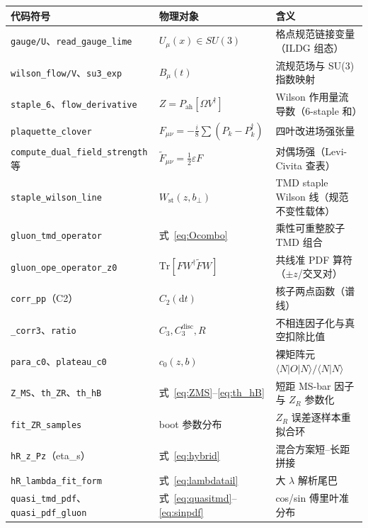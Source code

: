 \documentclass[UTF8]{ctexart}
\begin{document}
\begin{xltabular}{\textwidth}{Xll}
\toprule
代码符号 & 物理对象 & 含义 \\
\midrule
\endhead
\texttt{\nolinkurl{gauge/U}}、\texttt{\nolinkurl{read_gauge_lime}} & $U_\mu(x)\in SU(3)$ & 格点规范链接变量（ILDG 组态） \\
\texttt{\nolinkurl{wilson_flow/V}}、\texttt{\nolinkurl{su3_exp}} & $B_\mu(t)$ & 流规范场与 SU(3) 指数映射 \\
\texttt{\nolinkurl{staple_6}}、\texttt{\nolinkurl{flow_derivative}} & $Z=P_{\mathrm{ah}}[\Omega V^\dagger]$ & Wilson 作用量流导数（6-staple 和） \\
\texttt{\nolinkurl{plaquette_clover}} & $F_{\mu\nu}=-\frac{i}{8}\sum(P_k-P_k^\dagger)$ & 四叶改进场强张量 \\
\texttt{\nolinkurl{compute_dual_field_strength}} 等 & $\tilde F_{\mu\nu}=\frac12\varepsilon F$ & 对偶场强（Levi-Civita 查表） \\
\texttt{\nolinkurl{staple_wilson_line}} & $W_{\mathrm{st}}(z,b_\perp)$ & TMD staple Wilson 线（规范不变性载体） \\
\texttt{\nolinkurl{gluon_tmd_operator}} & 式~\eqref{eq:Ocombo} & 乘性可重整胶子 TMD 组合 \\
\texttt{\nolinkurl{gluon_ope_operator_z0}} & $\mathrm{Tr}[FW^\dagger\tilde FW]$ & 共线准 PDF 算符（$\pm z$/交叉对） \\
\texttt{\nolinkurl{corr_pp}}（C2） & $C_2(\mathrm dt)$ & 核子两点函数（谱线） \\
\texttt{\nolinkurl{_corr3}}、\texttt{\nolinkurl{ratio}} & $C_3,C_3^{\mathrm{disc}},R$ & 不相连因子化与真空扣除比值 \\
\texttt{\nolinkurl{para_c0}}、\texttt{\nolinkurl{plateau_c0}} & $c_0(z,b)$ & 裸矩阵元 $\langle N|O|N\rangle/\langle N|N\rangle$ \\
\texttt{\nolinkurl{Z_MS}}、\texttt{\nolinkurl{th_ZR}}、\texttt{\nolinkurl{th_hB}} & 式~\eqref{eq:ZMS}--\eqref{eq:th_hB} & 短距 MS-bar 因子与 $Z_R$ 参数化 \\
\texttt{\nolinkurl{fit_ZR_samples}} & boot 参数分布 & $Z_R$ 误差逐样本重拟合环 \\
\texttt{\nolinkurl{hR_z_Pz}}（eta\_s） & 式~\eqref{eq:hybrid} & 混合方案短--长距拼接 \\
\texttt{\nolinkurl{hR_lambda_fit_form}} & 式~\eqref{eq:lambdatail} & 大 $\lambda$ 解析尾巴 \\
\texttt{\nolinkurl{quasi_tmd_pdf}}、\texttt{\nolinkurl{quasi_pdf_gluon}} & 式~\eqref{eq:quasitmd}--\eqref{eq:sinpdf} & cos/sin 傅里叶准分布 \\

\end{xltabular}
\end{document}
